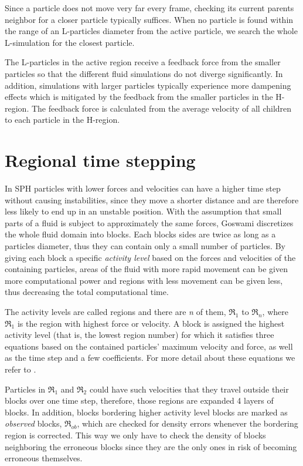 \documentclass[../../main.tex]{subfiles}
\begin{document}
Since a particle does not move very far every frame, checking its current parents neighbor for a closer particle typically suffices. When no particle is found within the range of an L-particles diameter from the active particle, we search the whole L-simulation for the closest particle. 

The L-particles in the active region receive a feedback force from the smaller particles so that the different fluid simulations do not diverge significantly. In addition, simulations with larger particles typically experience more dampening effects which is mitigated by the feedback from the smaller particles in the H-region. The feedback force is calculated from the average velocity of all children to each particle in the H-region. 

\section{Regional time stepping}
In SPH particles with lower forces and velocities can have a higher time step without causing instabilities, since they move a shorter distance and are therefore less likely to end up in an unstable position. With the assumption that small parts of a fluid is subject to approximately the same forces, Goswami discretizes the whole fluid domain into blocks. Each blocks sides are twice as long as a particles diameter, thus they can contain only a small number of particles. By giving each block a specific \textit{activity level} based on the forces and velocities of the containing particles, areas of the fluid with more rapid movement can be given more computational power and regions with less movement can be given less, thus decreasing the total computational time. 

The activity levels are called regions and there are \textit{n} of them, $\Re_1$ to $\Re_n$, where $\Re_1$ is the region with highest force or velocity. A block is assigned the highest activity level (that is, the lowest region number) for which it satisfies three equations based on the contained particles' maximum velocity and force, as well as the time step and a few coefficients. For more detail about these equations we refer to \citet{goswami2014regional}.

Particles in $\Re_1$ and $\Re_2$ could have such velocities that they travel outside their blocks over one time step, therefore, those regions are expanded 4 layers of blocks. In addition, blocks bordering higher activity level blocks are marked as \textit{observed} blocks, $\Re_{ob}$, which are checked for density errors whenever the bordering region is corrected. This way we only have to check the density of blocks neighboring the erroneous blocks since they are the only ones in risk of becoming erroneous themselves. 
\end{document}
